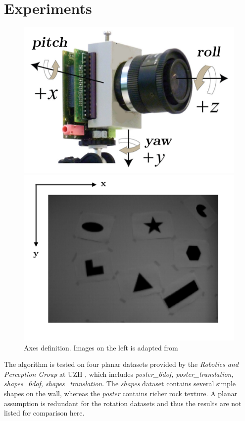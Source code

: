 \section{Experiments}
\label{sec:experiments}
\begin{figure}[h]
  \begin{minipage}[t]{0.48\textwidth}
    \centering \includegraphics[width = \textwidth]{images/axes.png}
  \end{minipage}
  \hfill
  \begin{minipage}[t]{0.48\textwidth}
    \centering \includegraphics[width =
    \textwidth]{images/axes_frame.png}
  \end{minipage}
  \hfill
  \caption{Axes definition. Images on the left is adapted from
    \citep{gallego2017accurate}}
  \label{fig:axes}
\end{figure}
The algorithm is tested on four planar datasets provided by the
\textit{Robotics and Perception Group} at UZH
\citep{mueggler2017event}, which includes \textit{poster\_6dof,
  poster\_translation, shapes\_6dof, shapes\_translation}. The
\textit{shapes} dataset contains several simple shapes on the wall,
whereas the \textit{poster} contains richer rock texture. A planar
assumption is redundant for the rotation datasets and thus the results
are not listed for comparison here.

